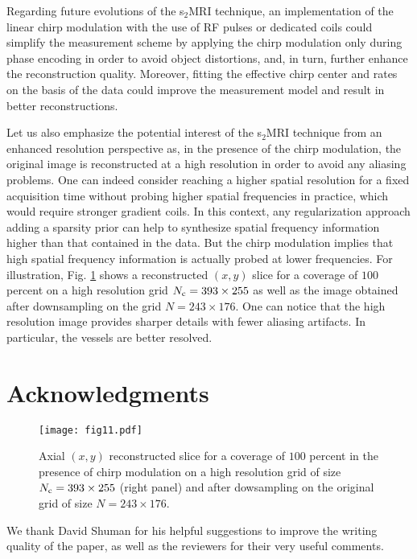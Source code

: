 \documentclass[10pt,draftcls, onecolumn]{IEEEtran}
\begin{document}
Regarding future evolutions of the s$_2$MRI technique, an implementation of the linear chirp modulation with the use of RF pulses or dedicated coils could simplify the measurement scheme by applying the chirp modulation only during phase encoding in order to avoid object distortions, and, in turn, further enhance the reconstruction quality. Moreover, fitting the effective chirp center and rates on the basis of the data could improve the measurement model and result in better reconstructions.

Let us also emphasize the potential interest of the s$_2$MRI technique from an enhanced resolution perspective as, in the presence of the chirp modulation, the original image is reconstructed at a high resolution in order to avoid any aliasing problems. One can indeed consider reaching a higher spatial resolution for a fixed acquisition time without probing higher spatial frequencies in practice, which would require stronger gradient coils. In this context, any regularization approach adding a sparsity prior can help to synthesize spatial frequency information higher than that contained in the data. But the chirp modulation implies that high spatial frequency information is actually probed at lower frequencies. For illustration, Fig. \ref{fig:high resolution} shows a reconstructed $(x, y)$ slice for a coverage of $100$ percent on a high resolution grid $N_{\rm c} = 393 \times 255$ as well as the image obtained after downsampling on the grid $N = 243 \times 176$. One can notice that the high resolution image provides sharper details with fewer aliasing artifacts. In particular, the vessels are better resolved.

\section*{Acknowledgments}

\begin{figure}
\centering
\texttt{[image: fig11.pdf]}
\caption{\label{fig:high resolution} Axial $(x, y)$ reconstructed slice for a coverage of $100$ percent in the presence of chirp modulation on a high resolution grid of size $N_{\rm c} = 393 \times 255$ (right panel) and after dowsampling on the original grid of size $N = 243 \times 176$.}
\vspace{-7mm}
\end{figure}


We thank David Shuman for his helpful suggestions to improve the writing quality of the paper, as well as the reviewers for their very useful comments.
\end{document}

